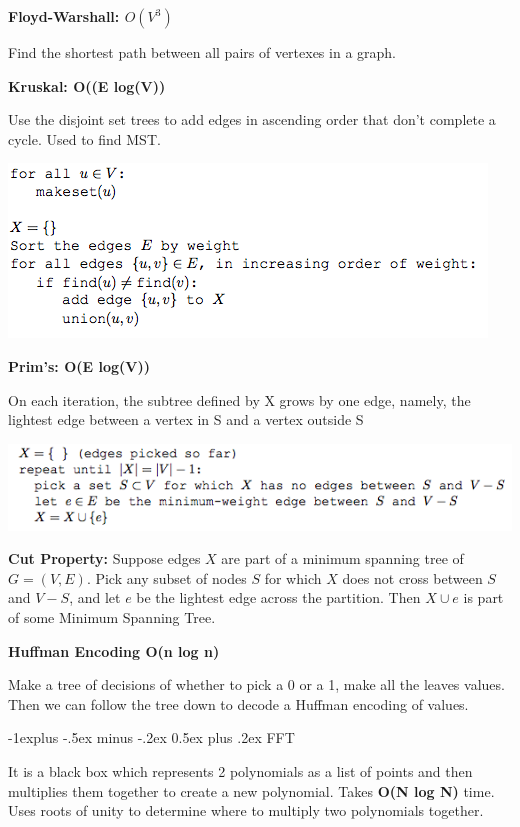 \documentclass[landscape]{article}
\makeatletter
\renewcommand{\subsection}{\@startsection{subsection}{2}{0mm}%
                            {-1explus -.5ex minus -.2ex}%
                            {0.5ex plus .2ex}%
                            {\normalfont\normalsize\bfseries}}
\makeatother
\begin{document}
\begin{multicols}{3}
\textbf{Floyd-Warshall: $O(V^3)$}

Find the shortest path between all pairs of vertexes in a graph.

\textbf{Kruskal: O((E log(V))}

Use the disjoint set trees to add edges in ascending order that don't complete a cycle. Used to find MST.

\includegraphics[scale=0.5]{kruskal}

\textbf{Prim's: O(E log(V))}

On each iteration, the subtree defined by X grows by one edge, namely, the lightest edge
between a vertex in S and a vertex outside S

\includegraphics[scale=0.42]{prim}

\textbf{Cut Property:}
Suppose edges $X$ are part of a minimum spanning tree of
$G = (V, E)$. Pick any subset of nodes $S$ for which $X$ does not
cross between $S$ and $V-S$, and let $e$ be the lightest edge across the
partition. Then $X \cup e$ is part of some Minimum Spanning Tree.



\textbf{Huffman Encoding O(n log n) }

Make a tree of decisions of whether to pick a 0 or a 1, make all the leaves values.
Then we can follow the tree down to decode a Huffman encoding of values.

\subsection{FFT}

It is a black box which represents 2 polynomials as a list of points and then multiplies them together to create a new polynomial. Takes \textbf{O(N log N)} time. Uses roots of unity to determine where to multiply two polynomials together.


\end{multicols}
\end{document}
